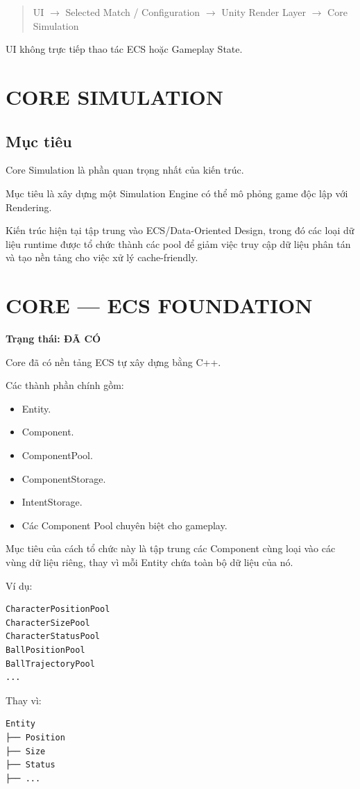 \documentclass[12pt,a4paper]{article}
\newcommand{\flow}[1]{%
  \begin{quote}\centering\ttfamily #1\end{quote}%
}
\begin{document}
\flow{UI $\rightarrow$ Selected Match / Configuration $\rightarrow$ Unity Render Layer $\rightarrow$ Core Simulation}

UI không trực tiếp thao tác ECS hoặc Gameplay State.

\section{CORE SIMULATION}

\subsection{Mục tiêu}

Core Simulation là phần quan trọng nhất của kiến trúc.

Mục tiêu là xây dựng một Simulation Engine có thể mô phỏng game độc lập với Rendering.

Kiến trúc hiện tại tập trung vào ECS/Data-Oriented Design, trong đó các loại dữ liệu runtime được tổ chức thành các pool để giảm việc truy cập dữ liệu phân tán và tạo nền tảng cho việc xử lý cache-friendly.

\section{CORE --- ECS FOUNDATION}
\textbf{Trạng thái: ĐÃ CÓ}

Core đã có nền tảng ECS tự xây dựng bằng C++.

Các thành phần chính gồm:
\begin{itemize}[nosep]
  \item Entity.
  \item Component.
  \item ComponentPool.
  \item ComponentStorage.
  \item IntentStorage.
  \item Các Component Pool chuyên biệt cho gameplay.
\end{itemize}

Mục tiêu của cách tổ chức này là tập trung các Component cùng loại vào các vùng dữ liệu riêng, thay vì mỗi Entity chứa toàn bộ dữ liệu của nó.

Ví dụ:
\begin{verbatim}
CharacterPositionPool
CharacterSizePool
CharacterStatusPool
BallPositionPool
BallTrajectoryPool
...
\end{verbatim}

Thay vì:
\begin{verbatim}
Entity
├── Position
├── Size
├── Status
├── ...
\end{verbatim}
\end{document}
